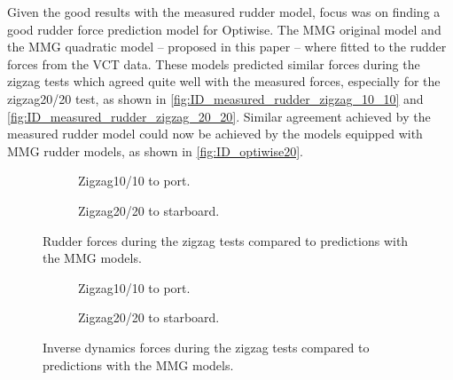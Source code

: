 Given the good results with the measured rudder model, focus was on finding a good rudder force prediction model for Optiwise. The MMG original model and the MMG quadratic model -- proposed in this paper -- where fitted to the rudder forces from the VCT data. These models predicted similar forces during the zigzag tests which agreed quite well with the measured forces, especially for the zigzag20/20 test, as shown in \autoref{fig:ID_measured_rudder_zigzag_10_10} and \autoref{fig:ID_measured_rudder_zigzag_20_20}.
Similar agreement achieved by the measured rudder model could now be achieved by the models equipped with MMG rudder models, as shown in \autoref{fig:ID_optiwise20}.


\begin{figure}[h]
    \centering
    \begin{subfigure}[b]{\textwidth}
        \centering
        
        \caption{Zigzag10/10 to port.}
        \label{fig:ID_measured_rudder_zigzag_10_10}
    \end{subfigure}
     \vfill
    \begin{subfigure}[b]{\textwidth}
        \centering
        
        \caption{Zigzag20/20 to starboard.}
        \label{fig:ID_measured_rudder_zigzag_20_20}
    \end{subfigure}
    \caption{Rudder forces during the zigzag tests compared to predictions with the MMG models.}
    \label{fig:ID_optiwise20}
\end{figure}


\begin{figure}[h]
    \centering
    \begin{subfigure}[b]{\textwidth}
        \centering
        
        \caption{Zigzag10/10 to port.}
        \label{fig:ID_MMG_zigzag_10_10}
    \end{subfigure}
     \vfill
    \begin{subfigure}[b]{\textwidth}
        \centering
        
        \caption{Zigzag20/20 to starboard.}
        \label{fig:ID_MMG_zigzag_20_20}
    \end{subfigure}
    \caption{Inverse dynamics forces during the zigzag tests compared to predictions with the MMG models.}
    \label{fig:ID_optiwise20}
\end{figure}


